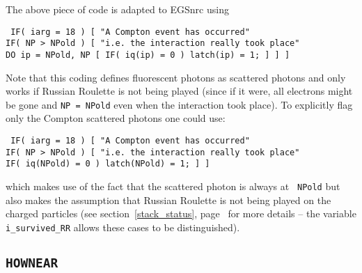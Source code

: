 The above piece of code is adapted to EGSnrc using
\begin{flushleft}{\tt
IF( iarg = 18 ) [ "A Compton event has occurred" \\
\quad IF( NP > NPold ) [ "i.e. the interaction really took place" \\
\quad \quad DO ip = NPold, NP [
IF( iq(ip) = 0 ) latch(ip) = 1; ] ] ] }
\end{flushleft}
Note that this coding defines fluorescent photons as scattered photons and
only works if Russian Roulette is not being played (since if it were, all
electrons might be gone and {\tt NP = NPold} even when the interaction took
place). To
explicitly  flag only the Compton scattered photons one could use:
\begin{flushleft}{\tt
IF( iarg = 18 ) [ "A Compton event has occurred" \\
\quad IF( NP > NPold ) [ "i.e. the interaction really took place" \\
\quad \quad IF( iq(NPold) = 0 ) latch(NPold) = 1; ] ]  }
\end{flushleft}
which makes use of the fact that the scattered photon is always at {\tt
NPold} but also makes the assumption that Russian Roulette is not being
played on the charged particles (see
section~\ref{stack_status}, page~\pageref{stack_status} for more
details -- the variable {\tt i\_survived\_RR} allows these cases to be
distinguished).


\subsection{\tt HOWNEAR}
\label{hownear_change}


